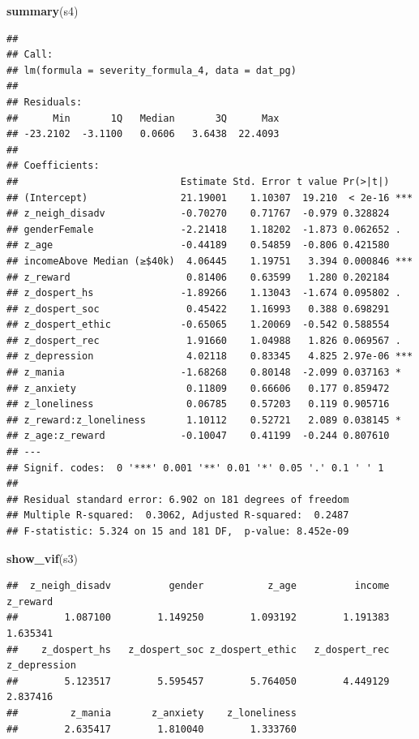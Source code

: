 \documentclass[
]{article}
\newenvironment{Shaded}{\begin{snugshade}}{\end{snugshade}}
\newcommand{\FunctionTok}[1]{\textcolor[rgb]{0.13,0.29,0.53}{\textbf{#1}}}
\newcommand{\NormalTok}[1]{#1}
\begin{document}
\begin{Shaded}
\begin{Highlighting}[]
\FunctionTok{summary}\NormalTok{(s4)}
\end{Highlighting}
\end{Shaded}

\begin{verbatim}
## 
## Call:
## lm(formula = severity_formula_4, data = dat_pg)
## 
## Residuals:
##      Min       1Q   Median       3Q      Max 
## -23.2102  -3.1100   0.0606   3.6438  22.4093 
## 
## Coefficients:
##                            Estimate Std. Error t value Pr(>|t|)    
## (Intercept)                21.19001    1.10307  19.210  < 2e-16 ***
## z_neigh_disadv             -0.70270    0.71767  -0.979 0.328824    
## genderFemale               -2.21418    1.18202  -1.873 0.062652 .  
## z_age                      -0.44189    0.54859  -0.806 0.421580    
## incomeAbove Median (≥$40k)  4.06445    1.19751   3.394 0.000846 ***
## z_reward                    0.81406    0.63599   1.280 0.202184    
## z_dospert_hs               -1.89266    1.13043  -1.674 0.095802 .  
## z_dospert_soc               0.45422    1.16993   0.388 0.698291    
## z_dospert_ethic            -0.65065    1.20069  -0.542 0.588554    
## z_dospert_rec               1.91660    1.04988   1.826 0.069567 .  
## z_depression                4.02118    0.83345   4.825 2.97e-06 ***
## z_mania                    -1.68268    0.80148  -2.099 0.037163 *  
## z_anxiety                   0.11809    0.66606   0.177 0.859472    
## z_loneliness                0.06785    0.57203   0.119 0.905716    
## z_reward:z_loneliness       1.10112    0.52721   2.089 0.038145 *  
## z_age:z_reward             -0.10047    0.41199  -0.244 0.807610    
## ---
## Signif. codes:  0 '***' 0.001 '**' 0.01 '*' 0.05 '.' 0.1 ' ' 1
## 
## Residual standard error: 6.902 on 181 degrees of freedom
## Multiple R-squared:  0.3062, Adjusted R-squared:  0.2487 
## F-statistic: 5.324 on 15 and 181 DF,  p-value: 8.452e-09
\end{verbatim}

\begin{Shaded}
\begin{Highlighting}[]
\FunctionTok{show\_vif}\NormalTok{(s3)}
\end{Highlighting}
\end{Shaded}

\begin{verbatim}
##  z_neigh_disadv          gender           z_age          income        z_reward 
##        1.087100        1.149250        1.093192        1.191383        1.635341 
##    z_dospert_hs   z_dospert_soc z_dospert_ethic   z_dospert_rec    z_depression 
##        5.123517        5.595457        5.764050        4.449129        2.837416 
##         z_mania       z_anxiety    z_loneliness 
##        2.635417        1.810040        1.333760
\end{verbatim}
\end{document}
